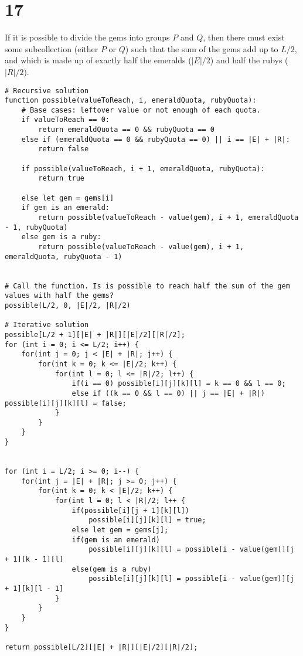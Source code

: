 \documentclass[letterpaper,notitlepage,twoside]{article}
\begin{document}
\section*{17}
If it is possible to divide the gems into groups $P$ and $Q$, then there must exist some subcollection (either $P$ or $Q$) such that the sum of the gems add up to $L/2$, and which is made up of exactly half the emeralds ($|E|/2$) and half the rubys ($|R|/2$).
\begin{verbatim}
# Recursive solution
function possible(valueToReach, i, emeraldQuota, rubyQuota):
    # Base cases: leftover value or not enough of each quota.
    if valueToReach == 0:
        return emeraldQuota == 0 && rubyQuota == 0            
    else if (emeraldQuota == 0 && rubyQuota == 0) || i == |E| + |R|:
        return false

    if possible(valueToReach, i + 1, emeraldQuota, rubyQuota):
        return true
    
    else let gem = gems[i]
    if gem is an emerald:
        return possible(valueToReach - value(gem), i + 1, emeraldQuota - 1, rubyQuota)
    else gem is a ruby:
        return possible(valueToReach - value(gem), i + 1, emeraldQuota, rubyQuota - 1)
        
        
# Call the function. Is is possible to reach half the sum of the gem values with half the gems?
possible(L/2, 0, |E|/2, |R|/2)

# Iterative solution
possible[L/2 + 1][|E| + |R|][|E|/2][|R|/2];
for (int i = 0; i <= L/2; i++) {
    for(int j = 0; j < |E| + |R|; j++) {
        for(int k = 0; k <= |E|/2; k++) {
            for(int l = 0; l <= |R|/2; l++) {
                if(i == 0) possible[i][j][k][l] = k == 0 && l == 0;
                else if ((k == 0 && l == 0) || j == |E| + |R|) possible[i][j][k][l] = false;
            }
        }
    }
}


for (int i = L/2; i >= 0; i--) {
    for(int j = |E| + |R|; j >= 0; j++) {
        for(int k = 0; k < |E|/2; k++) {
            for(int l = 0; l < |R|/2; l++ {
                if(possible[i][j + 1][k][l])
                    possible[i][j][k][l] = true;
                else let gem = gems[j];
                if(gem is an emerald)
                    possible[i][j][k][l] = possible[i - value(gem)][j + 1][k - 1][l]
                else(gem is a ruby)
                    possible[i][j][k][l] = possible[i - value(gem)][j + 1][k][l - 1]
            }
        }
    }
}

return possible[L/2][|E| + |R|][|E|/2][|R|/2];
\end{verbatim}
\end{document}
